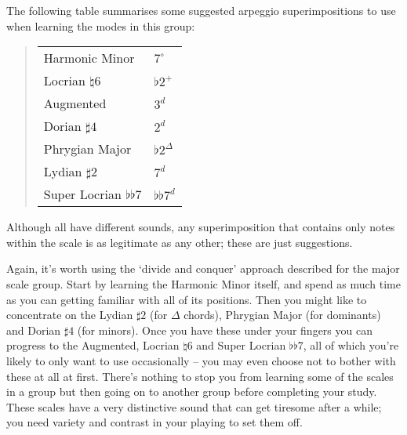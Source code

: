 \documentclass[english]{./gbook}
\begin{document}
\begin{large}
The following table summarises some suggested arpeggio superimpositions to use when learning the modes in this group:
\begin{quote}
	\begin{tabular}{ll}
		Harmonic Minor & $7^\circ$ \\
		Locrian $\natural 6$ & $\flat 2^+$\\
		Augmented & $3^d$\\
		Dorian $\sharp 4$ & $2^d$\\
		Phrygian Major & $\flat 2^{\Delta}$\\
		Lydian $\sharp 2$ & $7^d$\\ 
		Super Locrian $\flat\flat$7 & $\flat\flat 7^d$
	\end{tabular}
\end{quote}
Although all have different sounds, any superimposition that contains only notes within the scale is as legitimate as any other; these are just suggestions.

Again, it's worth using the `divide and conquer' approach described for the major scale group. Start by learning the Harmonic Minor itself, and spend as much time as you can getting familiar with all of its positions. Then you might like to concentrate on the Lydian $\sharp 2$ (for $\Delta$ chords), Phrygian Major (for dominants) and Dorian $\sharp 4$ (for minors). Once you have these under your fingers you can progress to the Augmented, Locrian $\natural 6$ and Super Locrian $\flat\flat$7, all of which you're likely to only want to use occasionally -- you may even choose not to bother with these at all at first. There's nothing to stop you from learning some of the scales in a group but then going on to another group before completing your study. These scales have a very distinctive sound that can get tiresome after a while; you need variety and contrast in your playing to set them off. 


\end{large}
\end{document}

